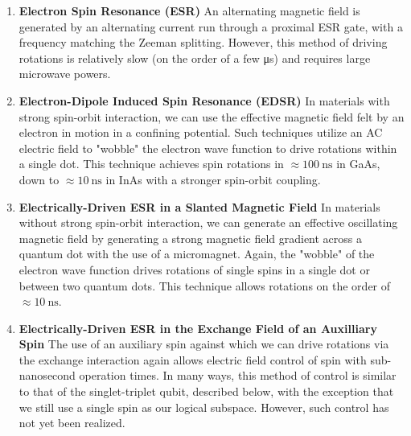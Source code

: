 \begin{enumerate}
  \item \textbf{Electron Spin Resonance (ESR)} An alternating magnetic field is generated by an alternating current run through a proximal ESR gate,
        with a frequency matching the Zeeman splitting\cite{nnano.2014.216}. However, this method of driving rotations is relatively
        slow (on the order of a few \si{\micro\second}) and requires large microwave powers.
  \item \textbf{Electron-Dipole Induced Spin Resonance (EDSR)} In materials with strong spin-orbit interaction, we can
        use the effective magnetic field felt by an electron in motion in a confining potential. Such techniques utilize an AC electric
        field to "wobble" the electron wave function to drive rotations within a single dot\cite{Nowack1430,nature11559}. This technique
        achieves spin rotations in $\approx \SI{100}{\nano\second}$ in GaAs, down to $\approx \SI{10}{\nano\second}$ in InAs with a stronger spin-orbit coupling.
  \item \textbf{Electrically-Driven ESR in a Slanted Magnetic Field} In materials without strong spin-orbit interaction,
        we can generate an effective oscillating magnetic field by generating a strong magnetic field gradient across a quantum dot with the use of a micromagnet.
        Again, the "wobble" of the electron wave function drives rotations of single spins in a single dot\cite{PhysRevLett.107.146801}
        or between two quantum dots\cite{2019arXiv190500346C}. This technique allows rotations on the order of $\approx \SI{10}{\nano\second}$.
  \item \textbf{Electrically-Driven ESR in the Exchange Field of an Auxilliary Spin} The use of an auxiliary spin against
        which we can drive rotations via the exchange interaction again  allows electric field control of spin with sub-nanosecond operation times\cite{PhysRevB.90.235311}.
        In many ways, this method of control is similar to that of the singlet-triplet qubit, described below, with the exception that we still use a single
        spin as our logical subspace. However, such control has not yet been realized.
\end{enumerate}

